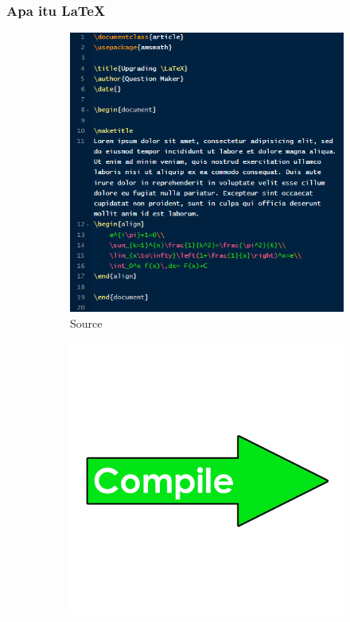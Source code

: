 \documentclass[aspectratio=169,10pt]{beamer}
\begin{document}
\begin{frame}
    \frametitle{Apa itu \LaTeX}
    \begin{figure}
        \begin{subfigure}[t!]{0.3\linewidth}
            \captionsetup{labelformat=empty}
            \caption{\huge{Source}}
            \includegraphics[width=\linewidth]{sourceLatex.png}
        \end{subfigure}
        \begin{subfigure}[t!]{0.3\linewidth}
            \includegraphics[width=\linewidth]{compile.png}

\end{subfigure}
\end{figure}
\end{frame}
\end{document}
